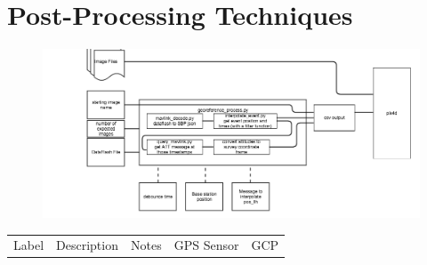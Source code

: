 \documentclass{article}
\begin{document}
\section{Post-Processing Techniques}
\begin{figure}
\begin{center}
\includegraphics[width=7in]{images/uav_survey_processing_architecture.png}
\end{center}
\end{figure}
\begin{tabular}[pos]{l|l|l|l|l}
Label & Description & Notes & GPS Sensor & GCP
\end{tabular}
\thispagestyle{lastpage}
\end{document}
